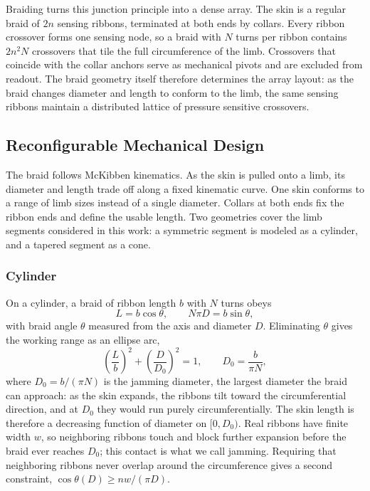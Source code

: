 \documentclass[letterpaper, 10 pt, conference]{ieeeconf}  %
\begin{document}
Braiding turns this junction principle into a dense array. The skin is a regular braid of $2n$ sensing ribbons, terminated at both ends by collars. Every ribbon crossover forms one sensing node, so a braid with $N$ turns per ribbon contains $2n^2 N$ crossovers that tile the full circumference of the limb. Crossovers that coincide with the collar anchors serve as mechanical pivots and are excluded from readout. The braid geometry itself therefore determines the array layout: as the braid changes diameter and length to conform to the limb, the same sensing ribbons maintain a distributed lattice of pressure sensitive crossovers.

\subsection{Reconfigurable Mechanical Design}\label{sec:braid-layout}
The braid follows McKibben kinematics. As the skin is pulled onto a limb, its diameter and length trade off along a fixed kinematic curve. One skin conforms to a range of limb sizes instead of a single diameter. Collars at both ends fix the ribbon ends and define the usable length. Two geometries cover the limb segments considered in this work: a symmetric segment is modeled as a cylinder, and a tapered segment as a cone.

\subsubsection{Cylinder}
On a cylinder, a braid of ribbon length $b$ with $N$ turns obeys
\begin{equation}
L = b\cos\theta, \qquad N\pi D = b\sin\theta,
\end{equation}
with braid angle $\theta$ measured from the axis and diameter $D$. Eliminating $\theta$ gives the working range as an ellipse arc,
\begin{equation}
\left(\frac{L}{b}\right)^{2} + \left(\frac{D}{D_0}\right)^{2} = 1, \qquad D_0 = \frac{b}{\pi N},
\end{equation}
where $D_0 = b/(\pi N)$ is the jamming diameter, the largest diameter the braid can approach: as the skin expands, the ribbons tilt toward the circumferential direction, and at $D_0$ they would run purely circumferentially. The skin length is therefore a decreasing function of diameter on $[0, D_0)$. Real ribbons have finite width $w$, so neighboring ribbons touch and block further expansion before the braid ever reaches $D_0$; this contact is what we call jamming. Requiring that neighboring ribbons never overlap around the circumference gives a second constraint, $\cos\theta(D) \geq nw/(\pi D)$.
\end{document}
